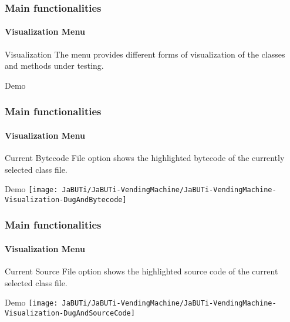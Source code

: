 \begin{frame}[parent={cmap:jabuti-gui},hasnext=true,hasprev=true]
\frametitle{Main functionalities}
\framesubtitle{Visualization Menu}
\label{concept:visualization-menu}

\begin{block}{Visualization}
The  menu provides different forms of visualization of
the classes and methods under testing.
\end{block}

\begin{block}{Demo}
\end{block}
\end{frame}



\begin{frame}
\frametitle{Main functionalities}
\framesubtitle{Visualization Menu}
\label{concept:current-bytecode-file}

\begin{block}{Current Bytecode File}
 option shows the highlighted bytecode of the
currently selected class file.
\end{block}

\begin{block}{Demo}
\texttt{[image: JaBUTi/JaBUTi-VendingMachine/JaBUTi-VendingMachine-Visualization-DugAndBytecode]}
\end{block}
\end{frame}



\begin{frame}
\frametitle{Main functionalities}
\framesubtitle{Visualization Menu}
\label{concept:current-source-file}

\begin{block}{Current Source File}
 option shows the highlighted source
code of the current selected class file.
\end{block}

\begin{block}{Demo}
\texttt{[image: JaBUTi/JaBUTi-VendingMachine/JaBUTi-VendingMachine-Visualization-DugAndSourceCode]}
\end{block}
\end{frame}



